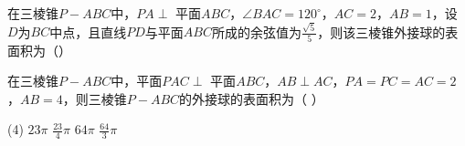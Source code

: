 \vspace{4em}

\begin{example}
    在三棱锥$P - ABC$中，$PA \perp$ 平面$ABC$，$\angle BAC = 120^\circ$，$AC = 2$，$AB = 1$，设$D$为$BC$中点，且直线$PD$与平面$ABC$所成的余弦值为$\frac{\sqrt{5}}{5}$，则该三棱锥外接球的表面积为（\hspace{1.5cm}）
\end{example}

\vspace{4em}

\begin{example}
    在三棱锥$P - ABC$中，平面$PAC \perp$ 平面$ABC$，$AB \perp AC$，$PA = PC = AC = 2$，$AB = 4$，则三棱锥$P - ABC$的外接球的表面积为（ \hspace{1.5cm}）
    \begin{tasks}(4)
        \task $23\pi$
        \task $\frac{23}{4}\pi$
        \task $64\pi$
        \task $\frac{64}{3}\pi$
    \end{tasks}
\end{example}



